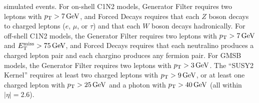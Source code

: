 \begin{sidewaystable}[tp]
{simulated events.
For on-shell C1N2 models, Generator Filter requires
two leptons with $\pt > 7\,\eV[G]$, and
Forced Decays requires
that each $Z$ boson decays to charged leptons ($e$, $\mu$, or $\tau$)
and that each $W$ boson decays hadronically.
For off-shell C1N2 models, the Generator Filter requires
two leptons with $\pt > 7\,\eV[G]$ and $\met > 75\,\eV[G]$, and
Forced Decays requires
that each neutralino produces a charged lepton pair and each chargino produces
any fermion pair.
For GMSB models, the Generator Filter requires
two leptons with $\pt > 3\,\eV[G]$.
The ``SUSY2 Kernel'' requires at least two charged leptons with
$\pt > 9\,\eV[G]$, or at least one charged lepton with
$\pt > 25\,\eV[G]$ and a photon with $\pt > 40\,\eV[G]$
(all within $|\eta|=2.6$).
}
\label{aux:ewk:cutflowSROffShell_2}
\end{sidewaystable}

